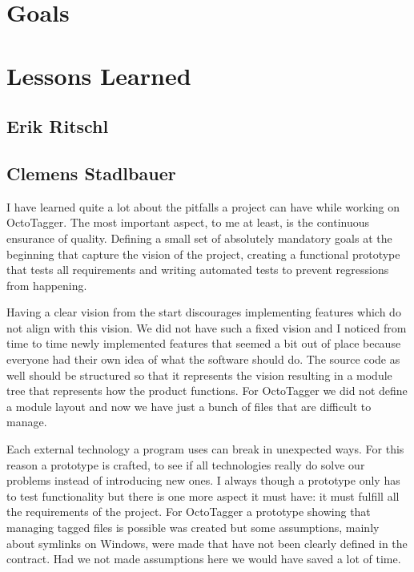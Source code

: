 \section{Goals}

\section{Lessons Learned}
\def\kapitelautor{}

\subsection{Erik Ritschl}
\subsection{Clemens Stadlbauer}

I have learned quite a lot about the pitfalls a project can have while working
on OctoTagger. The most important aspect, to me at least, is the continuous
ensurance of quality. Defining a small set of absolutely mandatory goals at the
beginning that capture the vision of the project, creating a functional
prototype that tests all requirements and writing automated tests to prevent
regressions from happening.

Having a clear vision from the start discourages implementing features which do
not align with this vision. We did not have such a fixed vision and I noticed
from time to time newly implemented features that seemed a bit out of place
because everyone had their own idea of what the software should do. The source
code as well should be structured so that it represents the vision resulting
in a module tree that represents how the product functions. For OctoTagger we
did not define a module layout and now we have just a bunch of files that are
difficult to manage.

Each external technology a program uses can break in unexpected ways. For this
reason a prototype is crafted, to see if all technologies really do solve our
problems instead of introducing new ones. I always though a prototype only has
to test functionality but there is one more aspect it must have: it must fulfill
all the requirements of the project. For OctoTagger a prototype showing that
managing tagged files is possible was created but some assumptions, mainly about
symlinks on Windows, were made that have not been clearly defined in the
contract. Had we not made assumptions here we would have saved a lot of time.

